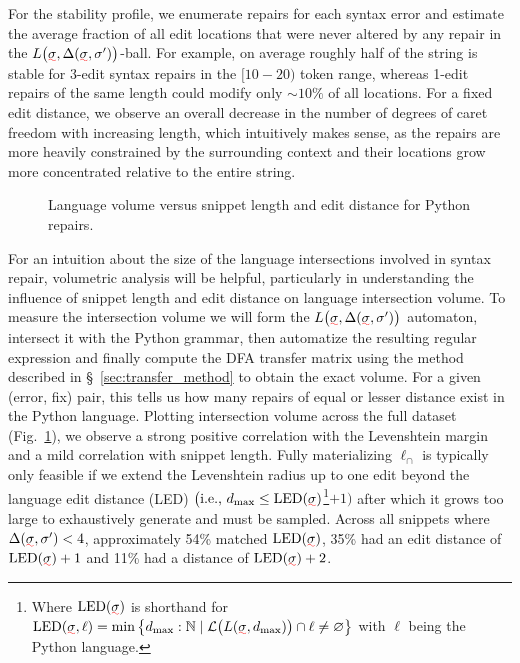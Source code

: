 \documentclass[sigplan,review,acmsmall,nonacm,screen,anonymous]{acmart}\settopmatter{printfolios=false,printccs=false,printacmref=false}
\begin{document}
For the stability profile, we enumerate repairs for each syntax error and estimate the average fraction of all edit locations that were never altered by any repair in the $L\big(\err\sigma, \Delta(\err\sigma, \sigma')\big)$-ball. For example, on average roughly half of the string is stable for 3-edit syntax repairs in the $[10-20)$ token range, whereas 1-edit repairs of the same length could modify only $\sim 10\%$ of all locations. For a fixed edit distance, we observe an overall decrease in the number of degrees of caret freedom with increasing length, which intuitively makes sense, as the repairs are more heavily constrained by the surrounding context and their locations grow more concentrated relative to the entire string.

\begin{figure}
\vspace{-0.4cm}
\resizebox{.45\textwidth}{!}{}
\vspace{-0.8cm}
\caption{Language volume versus snippet length and edit distance for Python repairs.}
\label{fig:volumetric_plot}
\vspace{-0.2cm}
\end{figure}

For an intuition about the size of the language intersections involved in syntax repair, volumetric analysis will be helpful, particularly in understanding the influence of snippet length and edit distance on language intersection volume. To measure the intersection volume we will form the $L\big(\err\sigma, \Delta(\err{\sigma}, \sigma')\big)$ automaton, intersect it with the Python grammar, then automatize the resulting regular expression and finally compute the DFA transfer matrix using the method described in \S~\ref{sec:transfer_method} to obtain the exact volume. For a given (error, fix) pair, this tells us how many repairs of equal or lesser distance exist in the Python language. Plotting intersection volume across the full dataset (Fig.~\ref{fig:volumetric_plot}), we observe a strong positive correlation with the Levenshtein margin and a mild correlation with snippet length. Fully materializing $\ell_\cap$ is typically only feasible if we extend the Levenshtein radius up to one edit beyond the language edit distance (LED) $\big(\text{i.e., } d_{\max} \leq \text{LED}(\err\sigma)$\footnote{Where $\text{LED}(\err\sigma)$ is shorthand for $\text{LED}(\err\sigma, \ell) = \min \big\{d_{\max}: \mathbb{N}\mid \mathcal{L}\big(L(\err\sigma, d_{\max})\big) \cap \ell \neq \varnothing\big\}$ with $\ell$ being the Python language.}$+ 1\big)$ after which it grows too large to exhaustively generate and must be sampled. Across all snippets where $\Delta(\err{\sigma}, \sigma') < 4$, approximately 54\% matched $\text{LED}(\err\sigma)$, 35\% had an edit distance of $\text{LED}(\err\sigma) + 1$ and 11\% had a distance of $\text{LED}(\err\sigma) + 2$.
\end{document}
